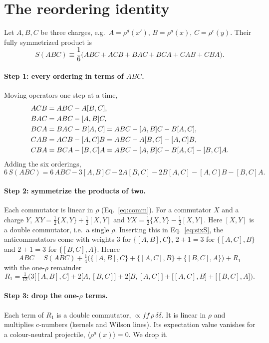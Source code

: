 \documentclass[10pt]{article}
\numberwithin{equation}{section}
\begin{document}
\section{The reordering identity}\label{sec:identity}

Let $A,B,C$ be three charges, e.g.\ $A=\rho^d(x')$, $B=\rho^a(x)$, $C=\rho^c(y)$. Their fully symmetrized product is
\begin{equation}
S(ABC)\equiv\frac16\big(ABC+ACB+BAC+BCA+CAB+CBA\big).
\end{equation}
\paragraph{Step 1: every ordering in terms of $ABC$.} Moving operators one step at a time,
\begin{align}
ACB&=ABC-A[B,C],\notag\\
BAC&=ABC-[A,B]C,\notag\\
BCA&=BAC-B[A,C]=ABC-[A,B]C-B[A,C],\notag\\
CAB&=ACB-[A,C]B=ABC-A[B,C]-[A,C]B,\notag\\
CBA&=BCA-[B,C]A=ABC-[A,B]C-B[A,C]-[B,C]A.
\end{align}
Adding the six orderings,
\begin{equation}
6\,S(ABC)=6\,ABC-3[A,B]C-2A[B,C]-2B[A,C]-[A,C]B-[B,C]A .
\label{eq:sixS}
\end{equation}
\paragraph{Step 2: symmetrize the products of two.} Each commutator is linear in $\rho$ (Eq.~\eqref{eq:comm}). For a commutator $X$ and a charge $Y$, $XY=\frac12\{X,Y\}+\frac12[X,Y]$ and $YX=\frac12\{X,Y\}-\frac12[X,Y]$. Here $[X,Y]$ is a double commutator, i.e.\ a single $\rho$. Inserting this in Eq.~\eqref{eq:sixS}, the anticommutators come with weights $3$ for $\{[A,B],C\}$, $2+1=3$ for $\{[A,C],B\}$ and $2+1=3$ for $\{[B,C],A\}$. Hence
\begin{equation}
\boxed{\;ABC=S(ABC)+\tfrac14\Big(\big\{[A,B],C\big\}+\big\{[A,C],B\big\}+\big\{[B,C],A\big\}\Big)+R_1\;}
\label{eq:plain}
\end{equation}
with the one-$\rho$ remainder
\begin{equation}
R_1=\tfrac1{12}\Big(3\big[[A,B],C\big]+2\big[A,[B,C]\big]+2\big[B,[A,C]\big]+\big[[A,C],B\big]+\big[[B,C],A\big]\Big).
\end{equation}
\paragraph{Step 3: drop the one-$\rho$ terms.} Each term of $R_1$ is a double commutator, $\propto f f\,\rho\,\delta\delta$. It is linear in $\rho$ and multiplies c-numbers (kernels and Wilson lines). Its expectation value vanishes for a colour-neutral projectile, $\langle\rho^a(x)\rangle=0$. We drop it.
\end{document}
